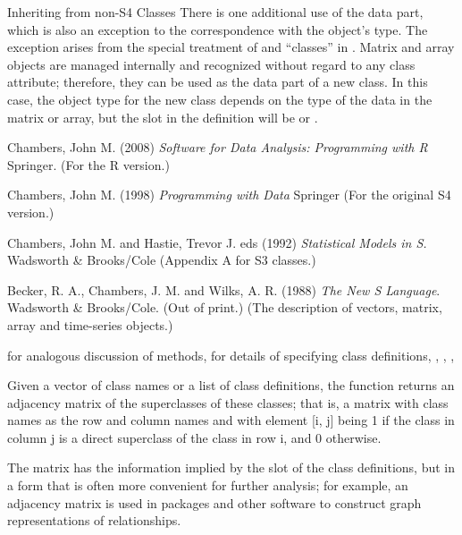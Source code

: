 \begin{Section}{Inheriting from non-S4 Classes}
There is  one additional use of the data part, which is also an
exception to the correspondence with the object's type.  The exception
arises from the special treatment of 
and  ``classes'' in \R{}.
Matrix and array objects are managed internally and recognized
without regard to any class attribute; therefore, they can be
used as the data part of a new class.  In this case, the object
type for the new class depends on the type of the data in the
matrix or array, but the  slot in the definition
will be  or .

\end{Section}
%
\begin{References}\relax
Chambers, John M. (2008)
\emph{Software for Data Analysis: Programming with R}
Springer.  (For the R version.)

Chambers, John M. (1998)
\emph{Programming with Data}
Springer (For the original S4 version.) 

Chambers, John M.  and Hastie, Trevor  J. eds (1992)
\emph{Statistical Models in S.}
Wadsworth \& Brooks/Cole (Appendix A for S3 classes.)

Becker, R. A., Chambers, J. M. and Wilks, A. R. (1988)
\emph{The New S Language}.
Wadsworth \& Brooks/Cole. (Out of print.) (The description of
vectors, matrix, array and time-series objects.)
\end{References}
%
\begin{SeeAlso}\relax
{} for analogous discussion of methods,
 for details of specifying class definitions,
,
,
,
\end{SeeAlso}
%
\begin{Description}\relax
Given a vector of class names or a list of class definitions, the
function returns an adjacency matrix of the superclasses of these
classes; that is, a matrix with class names as the row and column
names and with element [i, j] being 1 if the class in column j is a
direct superclass of the class in row i, and 0 otherwise.

The matrix has the information implied by the  slot of
the class definitions, but in a form that is often more convenient for
further analysis; for example, an adjacency matrix is used in packages
and other software to construct graph representations of relationships.
\end{Description}
